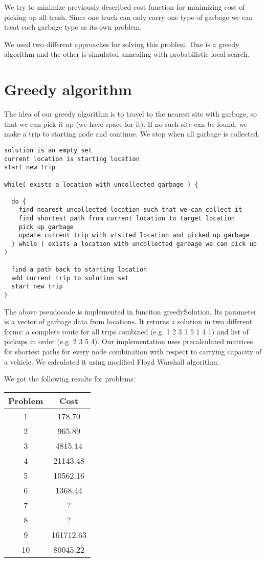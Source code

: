 \documentclass[a4paper, 12pt]{article}
\begin{document}
We try to minimize previously described cost function for minimizing cost of
picking up all trash. Since one truck can only carry one type of garbage we
can treat each garbage type as its own problem.

We used two different approaches for solving this problem. One is a greedy
algorithm and the other is simulated annealing with probabilistic local search.

\section{Greedy algorithm}

The idea of our greedy algorithm is to travel to the nearest site with garbage,
so that we can pick it up (we have space for it). If no such site can be found,
we make a trip to starting node and continue. We stop when all garbage is
collected.

\begin{lstlisting}[basicstyle=\small]
solution is an empty set
current location is starting location
start new trip

while( exists a location with uncollected garbage ) {

  do {
    find nearest uncollected location such that we can collect it
    find shortest path from current location to target location
    pick up garbage
    update current trip with visited location and picked up garbage
  } while ( exists a location with uncollected garbage we can pick up )

  find a path back to starting location
  add current trip to solution set
  start new trip
}
\end{lstlisting}

\newpage

The above pseudocode is implemented in funciton {\sf greedySolution}. Its
parameter is a vector of garbage data from locations. It returns a solution in
two different forms: a complete route for all trips combined (e.g. 1 2 3 1 5 1
4 1) and list of pickups in order (e.g. 2 3 5 4). Our implementation uses
precalculated matrices for shortest paths for every node combination with
respect to carrying capacity of a vehicle. We calculated it using modified
Floyd Warshall algorithm.

We got the following results for problems:
\begin{center}
\begin{tabular}{ c|c }
	Problem & Cost \\
	\hline
	1 & 178.70 \\
	2 & 965.89 \\
	3 & 4815.14 \\
	4 & 21143.48 \\
	5 & 10562.16 \\
	6 & 1368.44 \\
	7 & ? \\
	8 & ? \\
	9 & 161712.63 \\
	10 & 80045.22 \\
\end{tabular}
\end{center}
\end{document}
